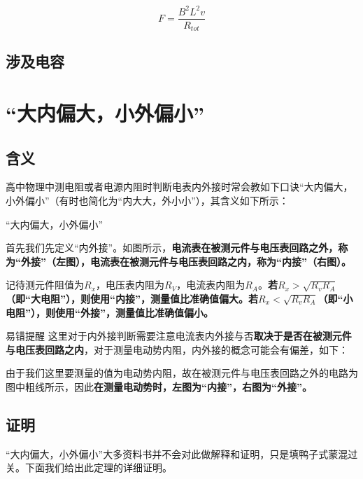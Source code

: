 \begin{equation}
\boxed{F = \frac{B^2 L^2 v}{R_{tot}}}
\end{equation}

\subsection{涉及电容}




\section{“大内偏大，小外偏小”}

\subsection{含义}
高中物理中测电阻或者电源内阻时判断电表内外接时常会教如下口诀“大内偏大，小外偏小”（有时也简化为“内大大，外小小”），其含义如下所示：

\begin{theo}{“大内偏大，小外偏小”}{}



首先我们先定义“内外接”。如图所示，\textbf{电流表在被测元件与电压表回路之外，称为“外接”（左图），电流表在被测元件与电压表回路之内，称为“内接”（右图）。}

记待测元件阻值为$R_x$，电压表内阻为$R_V$，电流表内阻为$R_A$。\textbf{若$R_x > \sqrt{R_v R_A}$（即“大电阻”），则使用“内接”，测量值比准确值偏大。若$R_x < \sqrt{R_v R_A}$（即“小电阻”），则使用“外接”，测量值比准确值偏小。}

\end{theo}

\begin{mk}{易错提醒}{}
这里对于内外接判断需要注意电流表内外接与否\textbf{取决于是否在被测元件与电压表回路之内}，对于测量电动势内阻，内外接的概念可能会有偏差，如下：



由于我们这里要测量的值为电动势内阻，故在被测元件与电压表回路之外的电路为图中粗线所示，因此\textbf{在测量电动势时，左图为“内接”，右图为“外接”。}
\end{mk}

\subsection{证明}
“大内偏大，小外偏小”大多资料书并不会对此做解释和证明，只是填鸭子式蒙混过关。下面我们给出此定理的详细证明。
~\\

